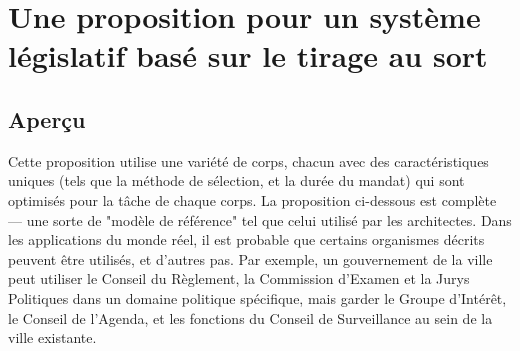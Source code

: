 
\section{Une proposition pour un système législatif basé sur le 
  tirage  au  sort} 
\subsection{Aperçu}
Cette proposition utilise une variété de corps, chacun avec des
caractéristiques uniques (tels que la méthode de sélection, et la
durée du mandat) qui sont optimisés pour la tâche de chaque corps. La
proposition ci-dessous est complète --- une sorte de "modèle de
référence" tel que celui utilisé par les architectes. Dans les
applications du monde réel, il est probable que certains organismes
décrits peuvent être utilisés, et d'autres pas. Par exemple, un
gouvernement de la ville peut utiliser le Conseil du Règlement, la
Commission d'Examen et la Jurys Politiques dans un domaine
politique spécifique, mais garder le Groupe d'Intérêt, le Conseil de
l'Agenda, et les fonctions du Conseil de Surveillance au sein de la 
ville existante.\par 
